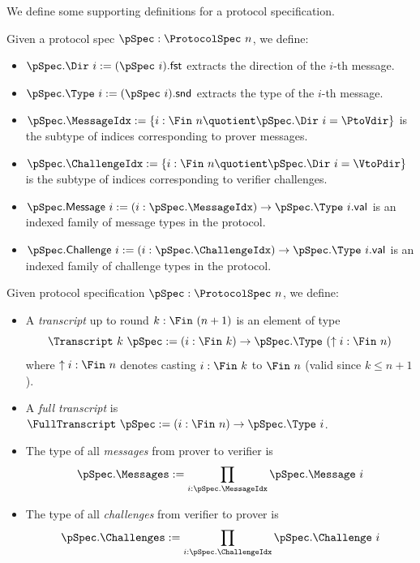 We define some supporting definitions for a protocol specification.

\begin{definition}
    \label{def:protocol_spec_components}
    Given a protocol spec $\pSpec : \ProtocolSpec\ n$, we define:
    \begin{itemize}
        \item $\pSpec.\Dir\ i := (\pSpec\ i).\mathsf{fst}$ extracts the direction of the $i$-th message.
        \item $\pSpec.\Type\ i := (\pSpec\ i).\mathsf{snd}$ extracts the type of the $i$-th message.
        \item $\pSpec.\MessageIdx := \{i : \Fin\ n \quotient \pSpec.\Dir\ i = \PtoVdir\}$ is the subtype of indices corresponding to prover messages.
        \item $\pSpec.\ChallengeIdx := \{i : \Fin\ n \quotient \pSpec.\Dir\ i = \VtoPdir\}$ is the subtype of indices corresponding to verifier challenges.
        \item $\pSpec.\mathsf{Message}\ i := (i : \pSpec.\MessageIdx) \to \pSpec.\Type\ i.\mathsf{val}$ is an indexed family of message types in the protocol.
        \item $\pSpec.\mathsf{Challenge}\ i := (i : \pSpec.\ChallengeIdx) \to \pSpec.\Type\ i.\mathsf{val}$ is an indexed family of challenge types in the protocol.
    \end{itemize}
\end{definition}

\begin{definition}
    \label{def:transcript}
        Given protocol specification $\pSpec : \ProtocolSpec\ n$, we define:
    \begin{itemize}
        \item A \emph{transcript} up to round $k : \Fin\ (n + 1)$ is an element of type
                \[ \Transcript\ k\ \pSpec := (i : \Fin\ k) \to \pSpec.\Type\ (\uparrow i : \Fin\ n) \]
        where $\uparrow i : \Fin\ n$ denotes casting $i : \Fin\ k$ to $\Fin\ n$ (valid since $k \leq n + 1$).

        \item A \emph{full transcript} is $\FullTranscript\ \pSpec := (i : \Fin\ n) \to \pSpec.\Type\ i$.

        \item The type of all \emph{messages} from prover to verifier is
        \[ \pSpec.\Messages := \prod_{i : \pSpec.\MessageIdx} \pSpec.\Message\ i \]

        \item The type of all \emph{challenges} from verifier to prover is
        \[ \pSpec.\Challenges := \prod_{i : \pSpec.\ChallengeIdx} \pSpec.\Challenge\ i \]
    \end{itemize}
\end{definition}

